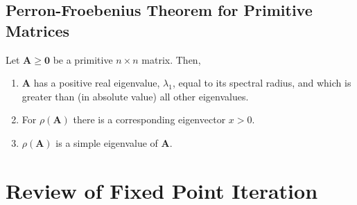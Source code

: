 \subsection{Perron-Froebenius Theorem for Primitive Matrices}

\begin{theorem}
Let $\mathbf{A} \ge \mathbf{0}$ be a primitive $n \times n$ matrix. Then,
	\begin{enumerate}
		\item $\mathbf{A}$ has a positive real eigenvalue, $\lambda_{1}$, equal to its spectral radius, and which is greater than (in absolute value) all other eigenvalues.
		\item For $\rho(\mathbf{A})$ there is a corresponding eigenvector $x > 0$.
		\item $\rho(\mathbf{A})$ is a simple eigenvalue of $\mathbf{A}$.
	\end{enumerate}
\end{theorem}

\section{Review of Fixed Point Iteration}

